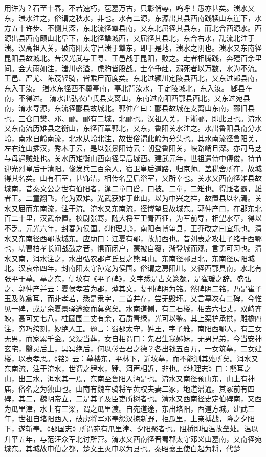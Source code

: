 \documentclass[12pt,UTF8]{ctexbook}
\begin{document}
用许为？石至十春，不若速朽，苞墓万古，只彰俏辱，呜呼！愚亦甚矣。滍水又东，滍水注之，俗谓之秋水，非也。水有二源，东源出其县西南践犊山东崖下，水方五十许步、不恻其深，东北流径犨县南，又东北屈径其县东，而北合西源水。西源出县西南颇山北阜下，东北径犨城西，又屈径其县北，东合右水，乱流北注于滍。汉高祖入关，破南阳太守吕滍于犨东，即于是地，滍水之阴也。滍水又东南径昆阳县故城北。昔汉光武与王寻、王邑战于昆阳，败之。走者相腾践，奔殪百余里间。会大雨如注，滍川盛溢，虎豹皆股战。士卒争赴，溺死者以万数，水为不流。王邑、严尤、陈茂轻骑，皆乘尸而度矣。东北过颍川定陵县西北，又东过郾县南，东入于汝。
滍水东径西不羹亭南，亭北背汝水，于定陵城北，东入汝。
郾县在南，不得过。
淯水出弘农卢氏县支离山，东南过南阳西鄂县西北，又东过宛县南，淯水导源，东流径郦县故城北。郭仲产曰：郦县故城在支离山东南，郦旧县也。三仓曰樊、邓、郦。郦有二城，北郦也。汉祖入关，下淅郦，即此县也。淯水又东南流历雉县之衡山，东径百章郭北，又东，鲁阳关水注之。水出鲁阳县南分水岭，南水自岭南流，北水从岭北注，故世俗谓此岭为分头也。其水南流径鲁阳关，左右连山插汉，秀木于云，是以张景阳诗云：朝登鲁阳关，峡路峭且深。亦司马芝与母遇贼处也。关水历雉衡山西南径皇后城西。建武元年，世祖遣侍中傅俊，持节迎光烈皇后于清阳。俊发兵三百余人，宿卫皇后道路，归京师。盖税舍所在，故城得其名矣。山有石室，甚饰洁，相传名皇后浴室，又所幸也。关水又西南径雉县故城南，昔秦文公之世有伯阳者，逢二童曰舀，曰被。二童，二雉也。得雌者霸，雄者王。二童翻飞，化为双雉。光武获雉于此山，以为中兴之祥，故置县以名焉。关水又屈而东南流，注于淯。淯水又东南流，径博望县故城东。郭仲产曰，在郡东北百二十里，汉武帝置。校尉张骞，随大将军卫青西征，为军前导，相望水草，得以不乏。元光六年，封春为侯国。《地理志》，南阳有博望县，王莽改之曰宜乐也。清水又东南径西鄂故城东。应助曰：江夏有鄂，故加西也。昔刘表之攻杜子绪于西鄂也，功曹柏孝长闻战鼓之音，惧而闭户，蒙被自覆，渐登城而观，言勇可习也。清水又南，洱水注之，水出弘农郡卢氏县之熊耳山。东南径郦县北，东南径房阳城北。汉哀帝四年，封南阳太守孙宠为侯国。俗谓之房阳川。又径西鄂具南，水北有张平于墓。墓之东，侧坟有《平子碑》，文字悉是古文篆额，是崔瑗之辞。盛弘之、郭仲产并云：夏侯孝若为郡，薄其文，复刊碑阴为铭。然碑阴二铭，乃是崔子玉及陈翕耳，而非孝若，悉是隶字，二首并存，尝无毁坏。又言墓次有二碑，今惟见一碑，或是余夏景驿途疲而莫究矣。水南道侧，有二石楼，相去六七丈，双峙齐竦，高可丈七八，柱圆围二丈有余，石质青绿，光可以鉴。其上栾护承拱，雕檐四注，穷巧绔刻，妙绝人工。题言：蜀郡太守，姓王，字子雅，南阳西鄂人，有三女无男，而家累千金。父没当葬，女自相谓曰：先君生我姊妹，无男兄弟，今当安神玄宅，翳灵后土，冥冥绝后，何以彰吾君之德？各出钱五百万，一女筑墓，二女建楼，以表孝思。《铭》云：墓楼东，平林下，近坟墓，而不能测其处所矣。洱水又东南流，注于淯水，世谓之肄水，肄、洱声相近，非也。《地理志》曰：熊耳之山，出三水，洱水其一焉，东南至鲁阳入沔是也。淯水又南径预山东，山上有神庙，俗名之为独山也。山南有魏车骑将军黄权夫妻二冢，地道潜通。其冢前有四碑，其二，魏明帝立，二是其子及臣吏所树者也。清水又西南径史定伯碑南，又西为瓜里津，水上有三梁，谓之瓜里渡。自宛道途，东出堵阳，西道方城。建武三年，世祖自堵阳西入，破虏将军邓奉怨汉掠新野，拒瓜里，上亲搏战，降之夕阳下，遂斩奉。《郡国志》所谓宛有爪里津、夕阳聚者也。阻桥即桓温故垒处。温以升平五年，与范汪众军北讨所营。淯水又西南径晋蜀郡太守邓义山墓南，又南径宛城东。其城故申伯之都，楚文王灭申以为县也。秦昭襄王使白起为将，代楚
\end{document}
